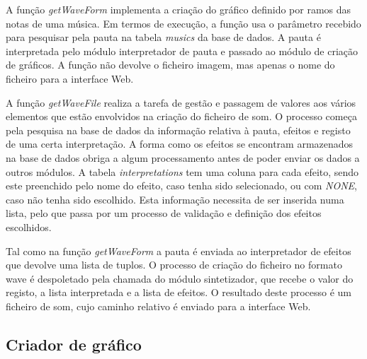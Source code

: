 \documentclass[11pt,openany,twoside]{report}
\begin{document}
A função \textit{getWaveForm} implementa a criação do gráfico definido por ramos das notas de uma música. Em termos de execução, a função usa o parâmetro recebido para pesquisar pela pauta na tabela \textit{musics} da base de dados. A pauta é interpretada pelo módulo interpretador de pauta e passado ao módulo de criação de gráficos. A função não devolve o ficheiro imagem, mas apenas o nome do ficheiro para a interface Web.

A função \textit{getWaveFile} realiza a tarefa de gestão e passagem de valores aos vários elementos que estão envolvidos na criação do ficheiro de som. O processo começa pela pesquisa na base de dados da informação relativa à pauta, efeitos e registo de uma certa interpretação. A forma como os efeitos  se encontram armazenados na base de dados obriga a algum processamento antes de poder enviar os dados a outros módulos. A tabela \textit{interpretations} tem uma coluna para cada efeito, sendo este preenchido pelo nome do efeito, caso tenha sido selecionado, ou com \textit{NONE}, caso não tenha sido escolhido. Esta informação necessita de ser inserida numa lista, pelo que passa por um processo de validação e definição dos efeitos escolhidos.

Tal como na função \textit{getWaveForm} a pauta é enviada ao interpretador de efeitos que devolve uma lista de tuplos. O processo de criação do ficheiro no formato \acs{wave} é despoletado pela chamada do módulo sintetizador, que recebe o valor do registo, a lista interpretada e a lista de efeitos. O resultado deste processo é um ficheiro de som, cujo caminho relativo é enviado para a interface Web.


\subsection{Criador de gráfico}
\end{document}
